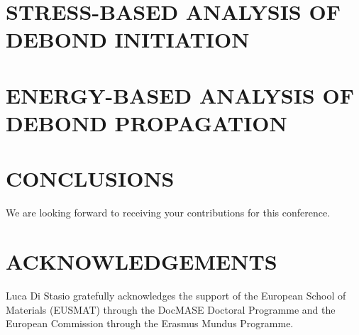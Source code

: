 \documentclass[12pt,a4paper]{article}
\begin{document}
\section{STRESS-BASED ANALYSIS OF DEBOND INITIATION}

\section{ENERGY-BASED ANALYSIS OF DEBOND PROPAGATION}

\section{CONCLUSIONS}

We are looking forward to receiving your contributions for this conference.

\section*{ACKNOWLEDGEMENTS}

Luca Di Stasio gratefully acknowledges the support of the European School of Materials (EUSMAT) through the DocMASE Doctoral Programme and the European Commission through the Erasmus Mundus Programme.



%
%


\end{document}
